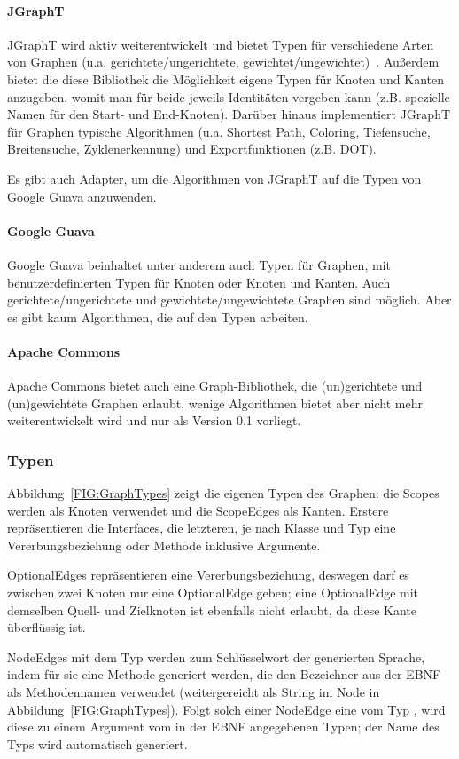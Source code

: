 \documentclass[../InterneDSLs.tex]{subfiles}
\begin{document}
\paragraph{JGraphT}
JGraphT wird aktiv weiterentwickelt und bietet Typen für verschiedene Arten von Graphen (u.a. gerichtete/ungerichtete, gewichtet/ungewichtet)~\cite{JGraphT}. Außerdem bietet die diese Bibliothek die Möglichkeit eigene Typen für Knoten und Kanten anzugeben, womit man für beide jeweils Identitäten vergeben kann (z.B. spezielle Namen für den Start- und End-Knoten). Darüber hinaus implementiert JGraphT für Graphen typische Algorithmen (u.a. Shortest Path, Coloring, Tiefensuche, Breitensuche, Zyklenerkennung) und Exportfunktionen (z.B. DOT).

Es gibt auch Adapter, um die Algorithmen von JGraphT auf die Typen von Google Guava anzuwenden.

\paragraph{Google Guava}
Google Guava beinhaltet unter anderem auch Typen für Graphen, mit benutzerdefinierten Typen für Knoten oder Knoten und Kanten. Auch gerichtete/ungerichtete und gewichtete/ungewichtete Graphen sind möglich. Aber es gibt kaum Algorithmen, die auf den Typen arbeiten.

\paragraph{Apache Commons}
Apache Commons bietet auch eine Graph-Bibliothek, die (un)gerichtete und (un)gewichtete Graphen erlaubt, wenige Algorithmen bietet aber nicht mehr weiterentwickelt wird und nur als Version 0.1 vorliegt.

\subsubsection{Typen}
Abbildung~\ref{FIG:GraphTypes} zeigt die eigenen Typen des Graphen: die Scopes werden als Knoten verwendet und die ScopeEdges als Kanten. Erstere repräsentieren die Interfaces, die letzteren, je nach Klasse und Typ eine Vererbungsbeziehung oder Methode inklusive Argumente.

OptionalEdges repräsentieren eine Vererbungsbeziehung, deswegen darf es zwischen zwei Knoten nur eine OptionalEdge geben; eine OptionalEdge mit demselben Quell- und Zielknoten ist ebenfalls nicht erlaubt, da diese Kante überflüssig ist.

NodeEdges mit dem Typ  werden zum Schlüsselwort der generierten Sprache, indem für sie eine Methode generiert werden, die den Bezeichner aus der EBNF als Methodennamen verwendet (weitergereicht als String im Node in Abbildung~\ref{FIG:GraphTypes}). Folgt solch einer NodeEdge eine vom Typ , wird diese zu einem Argument vom in der EBNF angegebenen Typen; der Name des Typs wird automatisch generiert.
\end{document}
